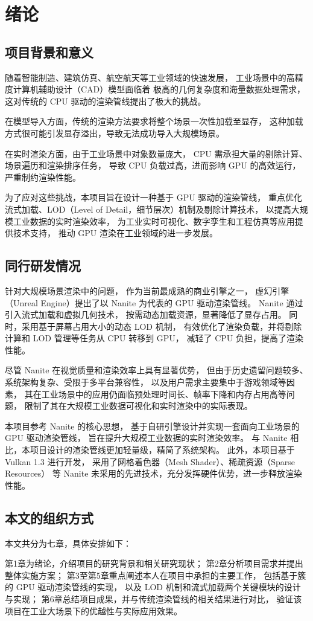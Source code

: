 \cleardoublepage

\section{绪论}

\subsection{项目背景和意义}
随着智能制造、建筑仿真、航空航天等工业领域的快速发展，
工业场景中的高精度计算机辅助设计（CAD）模型面临着
极高的几何复杂度和海量数据处理需求，
这对传统的 CPU 驱动的渲染管线提出了极大的挑战。

在模型导入方面，传统的渲染方法要求将整个场景一次性加载至显存，
这种加载方式很可能引发显存溢出，导致无法成功导入大规模场景。

在实时渲染方面，由于工业场景中对象数量庞大，
CPU 需承担大量的剔除计算、场景遍历和渲染排序任务，
导致 CPU 负载过高，进而影响 GPU 的高效运行，
严重制约渲染性能。

为了应对这些挑战，本项目旨在设计一种基于 GPU 驱动的渲染管线，
重点优化流式加载、LOD（Level of Detail，细节层次）机制及剔除计算技术，
以提高大规模工业数据的实时渲染效率，
为工业实时可视化、数字孪生和工程仿真等应用提供技术支持，
推动 GPU 渲染在工业领域的进一步发展。

\subsection{同行研发情况}

针对大规模场景渲染中的问题，
作为当前最成熟的商业引擎之一，
虚幻引擎（Unreal Engine）提出了以 Nanite 为代表的 GPU 驱动渲染管线。
Nanite 通过引入流式加载和虚拟几何技术，
按需动态加载资源，显著降低了显存占用。
同时，采用基于屏幕占用大小的动态 LOD 机制，
有效优化了渲染负载，并将剔除计算和 LOD 管理等任务从 CPU 转移到 GPU，
减轻了 CPU 负担，提高了渲染性能。

尽管 Nanite 在视觉质量和渲染效率上具有显著优势，
但由于历史遗留问题较多、系统架构复杂、受限于多平台兼容性，
以及用户需求主要集中于游戏领域等因素，
其在工业场景中的应用仍面临预处理时间长、帧率下降和内存占用高等问题，
限制了其在大规模工业数据可视化和实时渲染中的实际表现。

本项目参考 Nanite 的核心思想，
基于自研引擎设计并实现一套面向工业场景的 GPU 驱动渲染管线，
旨在提升大规模工业数据的实时渲染效率。
与 Nanite 相比，本项目设计的渲染管线更加轻量级，精简了系统架构。
此外，本项目基于 Vulkan 1.3 进行开发，
采用了网格着色器（Mesh Shader）、稀疏资源（Sparse Resources）
等 Nanite 未采用的先进技术，充分发挥硬件优势，进一步释放渲染性能。

\subsection{本文的组织方式}

本文共分为七章，具体安排如下：

第1章为绪论，介绍项目的研究背景和相关研究现状；  
第2章分析项目需求并提出整体实施方案；  
第3至第5章重点阐述本人在项目中承担的主要工作，  
包括基于簇的 GPU 驱动渲染管线的实现，
以及 LOD 机制和流式加载两个关键模块的设计与实现；
第6章总结项目成果，并与传统渲染管线的相关结果进行对比，  
验证该项目在工业大场景下的优越性与实际应用效果。